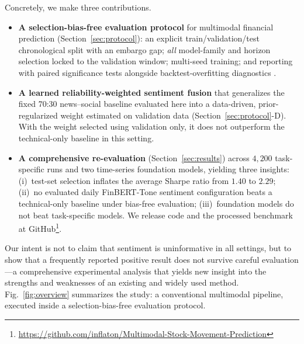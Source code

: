 \documentclass[conference]{IEEEtran}
\begin{document}
Concretely, we make three contributions.

\begin{itemize}
\item \textbf{A selection-bias-free evaluation protocol} for multimodal
financial prediction (Section~\ref{sec:protocol}): an explicit
train/validation/test chronological split with an embargo gap; \emph{all}
model-family and horizon selection locked to the validation window; multi-seed
training; and reporting with paired significance tests alongside
backtest-overfitting diagnostics \cite{bailey2014dsr,bailey2016pbo}.

\item \textbf{A learned reliability-weighted sentiment fusion} that generalizes
the fixed 70:30 news--social baseline evaluated here into
a data-driven, prior-regularized weight estimated on validation data
(Section~\ref{sec:protocol}-D). With the weight selected using validation
only, it does not outperform the technical-only baseline in this setting.

\item \textbf{A comprehensive re-evaluation} (Section~\ref{sec:results})
across $4{,}200$ task-specific runs and two time-series foundation models,
yielding three insights: (i)~test-set selection inflates the average Sharpe
ratio from $1.40$ to $2.29$; (ii)~no evaluated daily FinBERT-Tone sentiment configuration beats a
technical-only baseline under bias-free evaluation; (iii)~foundation models do
not beat task-specific models. We release code and the processed benchmark at GitHub\footnote{\url{https://github.com/inflaton/Multimodal-Stock-Movement-Prediction}}.
\end{itemize}

Our intent is not to claim that sentiment is uninformative in all settings, but
to show that a frequently reported positive result does not survive careful
evaluation---a comprehensive experimental analysis that yields new insight into
the strengths and weaknesses of an existing and widely used method.
Fig.~\ref{fig:overview} summarizes the study: a conventional multimodal
pipeline, executed inside a selection-bias-free evaluation protocol.
\end{document}
